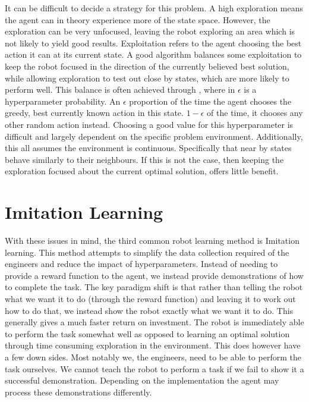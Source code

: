 It can be difficult to decide a strategy for this  problem. A high exploration means the agent can in theory experience more of the state space. However, the exploration can be very unfocused, leaving the robot exploring an area which is not likely to yield good results. Exploitation refers to the agent choosing the best action it can at its current state. A good algorithm balances some exploitation to keep the robot focused in the direction of the currently believed best solution, while allowing exploration to test out close by states, which are more likely to perform well. This balance is often achieved through , where in $\epsilon$ is a hyperparameter probability. An $\epsilon$ proportion of the time the agent chooses the greedy, best currently known action in this state. $1-\epsilon$ of the time, it chooses any other random action instead. Choosing a good value for this hyperparameter is difficult and largely dependent on the specific problem environment. Additionally, this all assumes the environment is continuous. Specifically that near by states behave similarly to their neighbours. If this is not the case, then keeping the exploration focused about the current optimal solution, offers little benefit.

\section{Imitation Learning}
\label{sec:imitation-learning}
With these issues in mind, the third common robot learning method is Imitation learning. This method attempts to simplify the data collection required of the engineers and reduce the impact of hyperparameters. Instead of needing to provide a reward function to the agent, we instead provide demonstrations of how to complete the task. The key paradigm shift is that rather than telling the robot what we want it to do (through the reward function) and leaving it to work out how to do that, we instead show the robot exactly what we want it to do. This generally gives a much faster return on investment. The robot is immediately able to perform the task somewhat well as opposed to learning an optimal solution through time consuming exploration in the environment. This does however have a few down sides. Most notably we, the engineers, need to be able to perform the task ourselves. We cannot teach the robot to perform a task if we fail to show it a successful demonstration. Depending on the implementation the agent may process these demonstrations differently. \\

